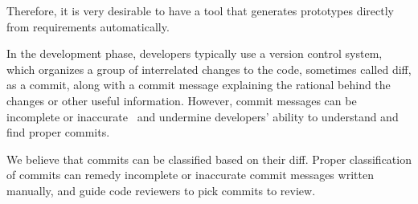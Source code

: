 Therefore, it is very desirable to have a tool that generates prototypes directly from requirements automatically. 

In the development phase, developers typically use a version control system, 
which organizes a group of interrelated changes to the code, sometimes called diff, as a commit, along with a commit message explaining the rational behind the changes or other useful information.
However, commit messages can be incomplete or inaccurate~\cite{buse2010automatically} and undermine developers' ability to understand and find proper commits.

We believe that commits can be classified based on their diff.
Proper classification of commits can remedy incomplete or inaccurate commit messages written manually, and
guide code reviewers to pick commits to review.




